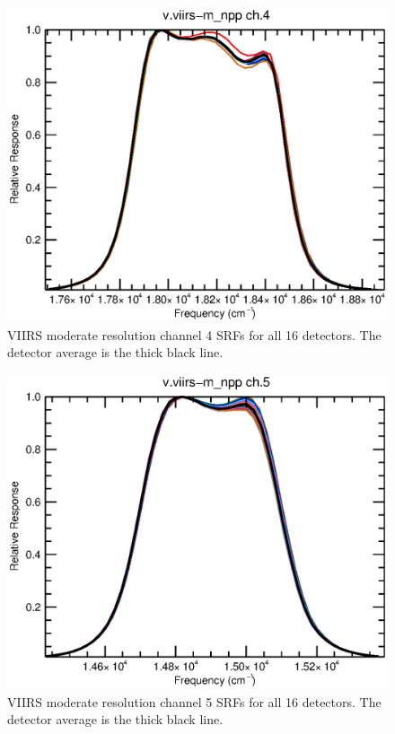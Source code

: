 \begin{figure}[H]
  \centering
  \includegraphics[bb= 0 15 400 330,clip,scale=0.8]{graphics/srfs/v.viirs-m_npp-04.eps}
  \caption{VIIRS moderate resolution channel 4 SRFs for all 16 detectors. The detector average is the thick black line.}
  \label{fig:v.viirs-m_npp-04}
\end{figure}
\begin{figure}[H]
  \centering
  \includegraphics[bb= 0 15 400 330,clip,scale=0.8]{graphics/srfs/v.viirs-m_npp-05.eps}
  \caption{VIIRS moderate resolution channel 5 SRFs for all 16 detectors. The detector average is the thick black line.}
  \label{fig:v.viirs-m_npp-05}
\end{figure}
